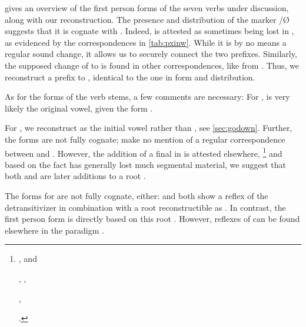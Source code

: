 

 gives an overview of the first person forms of the seven verbs under discussion, along with our \PPek reconstruction.
The presence and distribution of the \ikpeng {} marker /Ø suggests that it is cognate with \arara {} .
Indeed, \PXin {} is attested as sometimes being lost in \ikpeng, as evidenced by the correspondences in \cref{tab:pxinw}.
While it is by no means a regular sound change, it allows us to securely connect the two prefixes.
Similarly, the supposed change of  to \bakairi {} is found in other correspondences, like  \parencite{meira2005southern} from \PC {}  \parencite[4]{gildea2007greenberg}.
Thus, we reconstruct a  prefix  to \PPek, identical to the \arara one in form and distribution.

As for the forms of the verb stems, a few comments are necessary:
For , \ikpeng {} is very likely the original vowel, given the \PC form  .

For , we reconstruct  as the initial vowel rather than , see \cref{sec:godown}.
Further, the forms are not fully cognate; \textcite{meira2005southern} make no mention of a regular correspondence between \bakairi {} and \ikpeng {}.
However, the addition of a final  in \PXin is attested elsewhere,%
\footnote{
\begin{inlinelist}
\item \PC {} , \arara and \ikpeng {} %
\item \PC {} , \arara {}, \ikpeng {} %
\item \PC {} , \arara {}  %
\end{inlinelist} \parencites[8]{gildea2007greenberg}[56, 144, 57]{alves2017arara}[25, 270]{ikpengpacheco2001}.}
and based on the fact \bakairi has generally lost much segmental material, we suggest that both  and  are later additions to a root .



The forms for  are not fully cognate, either: \ikpeng and \bakairi both show a reflex of the \PPek detransitivizer  in combination with a root reconstructible as .
In contrast, the \arara first person form is directly based on this root .
However, reflexes of  can be found elsewhere in the \arara paradigm .

